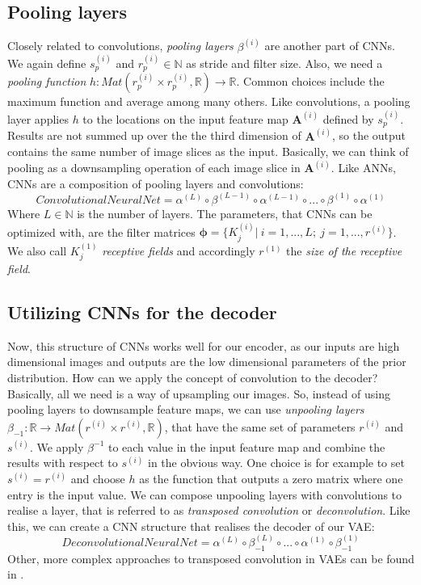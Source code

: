 \documentclass[12pt]{report}
\theoremstyle{definition}
\begin{document}
\subsection{Pooling layers}
Closely related to convolutions, \emph{pooling layers} $\beta^{(i)}$ are another part of CNNs. We again define $s_p^{(i)}$ and $r_p^{(i)}\in \mathbb{N}$ as stride and filter size. Also, we need a \emph{pooling function} $h: Mat(r_p^{(i)} \times r_p^{(i)}, \mathbb{R}) \rightarrow \mathbb{R}$. Common choices include the maximum function and average among many others. Like convolutions, a pooling layer applies $h$ to the locations on the input feature map $\mathbf{A}^{(i)}$ defined by $s_p^{(i)}$. Results are not summed up over the the third dimension of $\mathbf{A}^{(i)}$, so the output contains the same number of image slices as the input. Basically, we can think of pooling as a downsampling operation of each image slice in $\mathbf{A}^{(i)}$.
Like ANNs, CNNs are a composition of pooling layers and convolutions:
\begin{equation}
ConvolutionalNeuralNet = \alpha^{(L)} \circ \beta^{(L-1)} \circ \alpha^{(L-1)} \circ ... \circ \beta^{(1)} \circ \alpha^{(1)}
\end{equation}
Where $L \in \mathbb{N}$ is the number of layers. The parameters, that CNNs can be optimized with, are the filter matrices $\pmb{\phi} = \{ K^{(i)}_j | \ i=1, ..., L; \ j=1, ..., r^{(i)} \}$. We also call $K^{(1)}_j$ \emph{receptive fields} and accordingly $r^{(1)}$ the \emph{size of the receptive field}.

\subsection{Utilizing CNNs for the decoder}
Now, this structure of CNNs works well for our encoder, as our inputs are high dimensional images and outputs are the low dimensional parameters of the prior distribution. How can we apply the concept of convolution to the decoder?
Basically, all we need is a way of upsampling our images. So, instead of using pooling layers to downsample feature maps, we can use \emph{unpooling layers} $\beta_{-1}: \mathbb{R} \rightarrow Mat(r^{(i)} \times r^{(i)}, \mathbb{R})$, that have the same set of parameters $r^{(i)}$ and $s^{(i)}$. We apply $\beta^{-1}$ to each value in the input feature map and combine the results with respect to $s^{(i)}$ in the obvious way. One choice is for example to set $s^{(i)} = r^{(i)}$ and choose $h$ as the function that outputs a zero matrix where one entry is the input value. We can compose unpooling layers with convolutions to realise a layer, that is referred to as \emph{transposed convolution} or \emph{deconvolution}. Like this, we can create a CNN structure that realises the decoder of our VAE:
\begin{equation}
DeconvolutionalNeuralNet = \alpha^{(L)} \circ \beta^{(L)}_{-1} \circ ... \circ \alpha^{(1)} \circ \beta_{-1}^{(1)}
\end{equation}
Other, more complex approaches to transposed convolution in VAEs can be found in \cite{cvae}.
\end{document}
